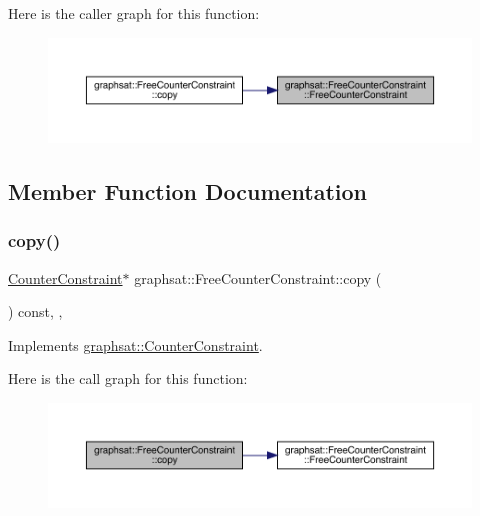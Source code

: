 Here is the caller graph for this function\+:
\nopagebreak
\begin{figure}[H]
\begin{center}
\leavevmode
\includegraphics[width=350pt]{classgraphsat_1_1_free_counter_constraint_a91b765518351c549e3683ca7b6d65a81_icgraph}
\end{center}
\end{figure}


\subsection{Member Function Documentation}
\mbox{\label{classgraphsat_1_1_free_counter_constraint_ac47312ffc877f233912491bf380769a9}} 
\subsubsection{\texorpdfstring{copy()}{copy()}}
{\footnotesize\ttfamily \mbox{\hyperlink{classgraphsat_1_1_counter_constraint}{Counter\+Constraint}}$\ast$ graphsat\+::\+Free\+Counter\+Constraint\+::copy (\begin{DoxyParamCaption}{ }\end{DoxyParamCaption}) const\hspace{0.3cm}{\ttfamily [inline]}, {\ttfamily [private]}, {\ttfamily [virtual]}}



Implements \mbox{\hyperlink{classgraphsat_1_1_counter_constraint_a880eb6520fcf80de35071d62cb31a640}{graphsat\+::\+Counter\+Constraint}}.

Here is the call graph for this function\+:
\nopagebreak
\begin{figure}[H]
\begin{center}
\leavevmode
\includegraphics[width=350pt]{classgraphsat_1_1_free_counter_constraint_ac47312ffc877f233912491bf380769a9_cgraph}
\end{center}
\end{figure}
\mbox{\label{classgraphsat_1_1_free_counter_constraint_adb132f25be53be665c6337224c95f15a}} 
